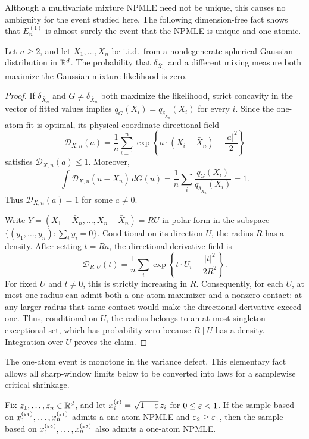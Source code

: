 Although a multivariate mixture NPMLE need not be unique, this causes no
ambiguity for the event studied here.  The following dimension-free fact
shows that \(E_n^{(1)}\) is almost surely the event that the NPMLE is unique
and one-atomic.

\begin{proposition}
\label{prop:one-atom-unique}
Let \(n\ge2\), and let \(X_1,\ldots,X_n\) be i.i.d.\ from a nondegenerate
spherical Gaussian distribution in \(\mathbb R^d\). The probability that
\(\delta_{\bar X_n}\) and a different mixing measure both maximize the
Gaussian-mixture likelihood is zero.
\end{proposition}

\begin{proof}
If \(\delta_{\bar X_n}\) and \(G\ne\delta_{\bar X_n}\) both maximize the
likelihood, strict concavity in the vector of fitted values implies
\(q_G(X_i)=q_{\delta_{\bar X_n}}(X_i)\) for every \(i\).  Since the one-atom
fit is optimal, its physical-coordinate directional field
\[
 \mathcal D_{X,n}(a)
 =\frac1n\sum_{i=1}^n
 \exp\left\{a\cdot(X_i-\bar X_n)-\frac{|a|^2}{2}\right\}
\]
satisfies \(\mathcal D_{X,n}(a)\le1\).
Moreover,
\[
 \int \mathcal D_{X,n}(u-\bar X_n)\,dG(u)
 =\frac1n\sum_i\frac{q_G(X_i)}
 {q_{\delta_{\bar X_n}}(X_i)}=1.
\]
Thus \(\mathcal D_{X,n}(a)=1\) for some \(a\ne0\).

Write \(Y=(X_1-\bar X_n,\ldots,X_n-\bar X_n)=RU\) in polar form in the subspace
\(\{(y_1,\ldots,y_n):\sum_i y_i=0\}\). Conditional on its direction \(U\),
the radius \(R\) has a density. After setting \(t=Ra\), the
directional-derivative field is
\[
 \mathcal D_{R,U}(t)
 =\frac1n\sum_i
 \exp\left\{t\cdot U_i-\frac{|t|^2}{2R^2}\right\}.
\]
For fixed \(U\) and \(t\ne0\), this is strictly increasing in \(R\).
Consequently, for each \(U\), at most one radius can admit both a one-atom
maximizer and a nonzero contact: at any larger radius that same contact
would make the directional derivative exceed one. Thus, conditional on
\(U\), the radius belongs to an at-most-singleton exceptional set, which has
probability zero because \(R\mid U\) has a density. Integration over \(U\)
proves the claim.
\end{proof}

The one-atom event is monotone in the variance defect. This elementary fact
allows all sharp-window limits below to be converted into laws for a
samplewise critical shrinkage.
\begin{lemma}
\label{lem:variance-monotonicity}
Fix $z_1,\ldots,z_n\in\mathbb R^d$, and let
$x_i^{(\varepsilon)}=\sqrt{1-\varepsilon}\,z_i$ for $0\le\varepsilon<1$. If the sample based on
$x_1^{(\varepsilon_1)},\ldots,x_n^{(\varepsilon_1)}$ admits a one-atom NPMLE and
$\varepsilon_2\ge\varepsilon_1$, then the sample based on
$x_1^{(\varepsilon_2)},\ldots,x_n^{(\varepsilon_2)}$ also admits a one-atom NPMLE.
\end{lemma}


